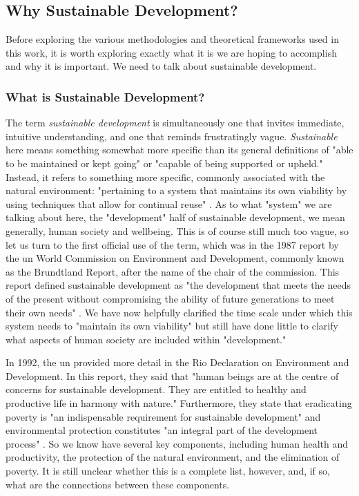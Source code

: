 \subsection{Why Sustainable Development?}

Before exploring the various methodologies and theoretical frameworks used in this work, it is worth exploring exactly what it is we are hoping to accomplish and why it is important. We need to talk about sustainable development.
 
\subsubsection{What is Sustainable Development?} \label{sec:sustain}

The term \textit{sustainable development} is simultaneously one that invites immediate, intuitive understanding, and one that reminds frustratingly vague. \textit{Sustainable} here means something somewhat more specific than its general definitions of "able to be maintained or kept going" or "capable of being supported or upheld." Instead, it refers to something more specific, commonly associated with the natural environment: "pertaining to a system that maintains its own viability by using techniques that allow for continual reuse" \cite{DefinitionSustainableDictionary}. As to what "system" we are talking about here, the "development" half of sustainable development, we mean generally, human society and wellbeing. This is of course still much too vague, so let us turn to the first official use of the term, which was in the 1987 report by the \ac{un} World Commission on Environment and Development, commonly known as the Brundtland Report, after the name of the chair of the commission. This report defined sustainable development as "the development that meets the needs of the present without compromising the ability of future generations to meet their own needs" \cite{worldcommissiononenvironmentanddevelopmentOurCommonFuture}. We have now helpfully clarified the time scale under which this system needs to "maintain its own viability" but still have done little to clarify what aspects of human society are included within "development." 

In 1992, the \ac{un} provided more detail in the Rio Declaration on Environment and Development. In this report, they said that "human beings are at the centre of concerns for sustainable development. They are entitled to healthy and productive life in harmony with nature." Furthermore, they state that eradicating poverty is "an indispensable requirement for sustainable development" and environmental protection constitutes "an integral part of the development process" \cite{unitednationsconferenceonenvironmentanddevelopmentRioDeclarationEnvironment1992}. So we know have several key components, including human health and productivity, the protection of the natural environment, and the elimination of poverty. It is still unclear whether this is a complete list, however, and, if so, what are the connections between these components.

